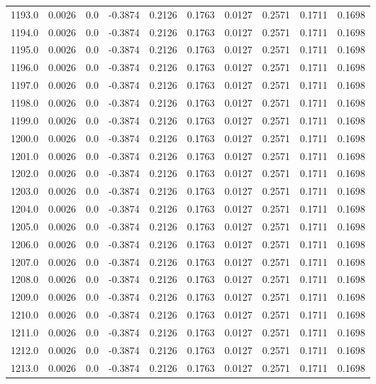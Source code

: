 \begin{longtable}{lrrrrrrrrr}
1193.0 & 0.0026 & 0.0 & -0.3874 & 0.2126 & 0.1763 & 0.0127 & 0.2571 & 0.1711 & 0.1698 \\
1194.0 & 0.0026 & 0.0 & -0.3874 & 0.2126 & 0.1763 & 0.0127 & 0.2571 & 0.1711 & 0.1698 \\
1195.0 & 0.0026 & 0.0 & -0.3874 & 0.2126 & 0.1763 & 0.0127 & 0.2571 & 0.1711 & 0.1698 \\
1196.0 & 0.0026 & 0.0 & -0.3874 & 0.2126 & 0.1763 & 0.0127 & 0.2571 & 0.1711 & 0.1698 \\
1197.0 & 0.0026 & 0.0 & -0.3874 & 0.2126 & 0.1763 & 0.0127 & 0.2571 & 0.1711 & 0.1698 \\
1198.0 & 0.0026 & 0.0 & -0.3874 & 0.2126 & 0.1763 & 0.0127 & 0.2571 & 0.1711 & 0.1698 \\
1199.0 & 0.0026 & 0.0 & -0.3874 & 0.2126 & 0.1763 & 0.0127 & 0.2571 & 0.1711 & 0.1698 \\
1200.0 & 0.0026 & 0.0 & -0.3874 & 0.2126 & 0.1763 & 0.0127 & 0.2571 & 0.1711 & 0.1698 \\
1201.0 & 0.0026 & 0.0 & -0.3874 & 0.2126 & 0.1763 & 0.0127 & 0.2571 & 0.1711 & 0.1698 \\
1202.0 & 0.0026 & 0.0 & -0.3874 & 0.2126 & 0.1763 & 0.0127 & 0.2571 & 0.1711 & 0.1698 \\
1203.0 & 0.0026 & 0.0 & -0.3874 & 0.2126 & 0.1763 & 0.0127 & 0.2571 & 0.1711 & 0.1698 \\
1204.0 & 0.0026 & 0.0 & -0.3874 & 0.2126 & 0.1763 & 0.0127 & 0.2571 & 0.1711 & 0.1698 \\
1205.0 & 0.0026 & 0.0 & -0.3874 & 0.2126 & 0.1763 & 0.0127 & 0.2571 & 0.1711 & 0.1698 \\
1206.0 & 0.0026 & 0.0 & -0.3874 & 0.2126 & 0.1763 & 0.0127 & 0.2571 & 0.1711 & 0.1698 \\
1207.0 & 0.0026 & 0.0 & -0.3874 & 0.2126 & 0.1763 & 0.0127 & 0.2571 & 0.1711 & 0.1698 \\
1208.0 & 0.0026 & 0.0 & -0.3874 & 0.2126 & 0.1763 & 0.0127 & 0.2571 & 0.1711 & 0.1698 \\
1209.0 & 0.0026 & 0.0 & -0.3874 & 0.2126 & 0.1763 & 0.0127 & 0.2571 & 0.1711 & 0.1698 \\
1210.0 & 0.0026 & 0.0 & -0.3874 & 0.2126 & 0.1763 & 0.0127 & 0.2571 & 0.1711 & 0.1698 \\
1211.0 & 0.0026 & 0.0 & -0.3874 & 0.2126 & 0.1763 & 0.0127 & 0.2571 & 0.1711 & 0.1698 \\
1212.0 & 0.0026 & 0.0 & -0.3874 & 0.2126 & 0.1763 & 0.0127 & 0.2571 & 0.1711 & 0.1698 \\
1213.0 & 0.0026 & 0.0 & -0.3874 & 0.2126 & 0.1763 & 0.0127 & 0.2571 & 0.1711 & 0.1698 \\

\end{longtable}
